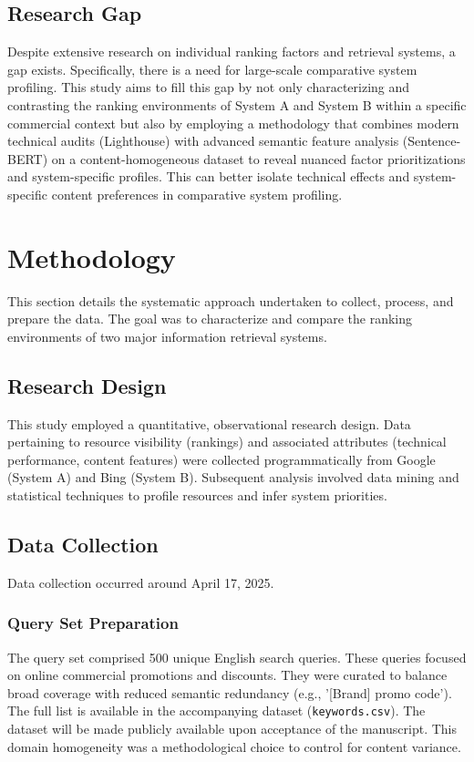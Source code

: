 \documentclass[a4paper,fleqn]{cas-sc}
\begin{document}
\subsection{Research Gap}
\label{subsec:lit_gap}
Despite extensive research on individual ranking factors and retrieval systems, a gap exists. Specifically, there is a need for large-scale comparative system profiling. This study aims to fill this gap by not only characterizing and contrasting the ranking environments of System A and System B within a specific commercial context but also by employing a methodology that combines modern technical audits (Lighthouse) with advanced semantic feature analysis (Sentence-BERT) on a content-homogeneous dataset to reveal nuanced factor prioritizations and system-specific profiles. This can better isolate technical effects and system-specific content preferences in comparative system profiling. 

\section{Methodology}
\label{sec:methodology}
This section details the systematic approach undertaken to collect, process, and prepare the data. The goal was to characterize and compare the ranking environments of two major information retrieval systems.

\subsection{Research Design}
\label{subsec:design}
This study employed a quantitative, observational research design. Data pertaining to resource visibility (rankings) and associated attributes (technical performance, content features) were collected programmatically from Google (System A) and Bing (System B). Subsequent analysis involved data mining and statistical techniques to profile resources and infer system priorities.

\subsection{Data Collection}
\label{subsec:collection}
Data collection occurred around April 17, 2025.
\subsubsection{Query Set Preparation}
\label{subsubsec:queries}
The query set comprised 500 unique English search queries. These queries focused on online commercial promotions and discounts. They were curated to balance broad coverage with reduced semantic redundancy (e.g., '[Brand] promo code'). The full list is available in the accompanying dataset (\texttt{keywords.csv}). The dataset will be made publicly available upon acceptance of the manuscript. This domain homogeneity was a methodological choice to control for content variance.
\end{document}
